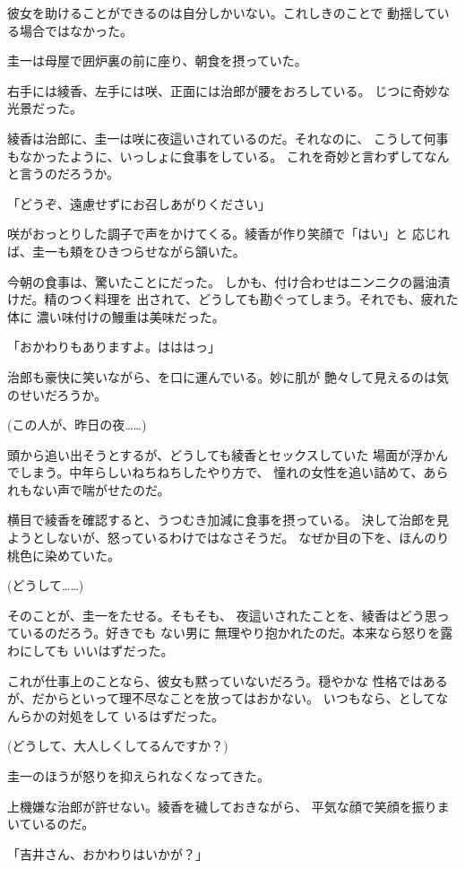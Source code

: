 ﻿\documentclass[
    book,tate,
    line_length=30zw,
    jafontsize=12pt,
    paper=b5j,
    landscape,
    ]{jlreq}
\begin{document}
彼女を助けることができるのは自分しかいない。これしきのことで
動揺している場合ではなかった。

圭一は母屋で囲炉裏の前に座り、朝食を摂っていた。

右手には綾香、左手には咲、正面には治郎が腰をおろしている。
じつに奇妙な光景だった。

綾香は治郎に、圭一は咲に夜這いされているのだ。それなのに、
こうして何事もなかったように、いっしょに食事をしている。
これを奇妙と言わずしてなんと言うのだろうか。

「どうぞ、遠慮せずにお召しあがりください」

咲がおっとりした調子で声をかけてくる。綾香が作り笑顔で「はい」と
応じれば、圭一も頬をひきつらせながら頷いた。

今朝の食事は、驚いたことにだった。
しかも、付け合わせはニンニクの醤油漬けだ。精のつく料理を
出されて、どうしても勘ぐってしまう。それでも、疲れた体に
濃い味付けの鰻重は美味だった。

「おかわりもありますよ。はははっ」

治郎も豪快に笑いながら、を口に運んでいる。妙に肌が
艶々して見えるのは気のせいだろうか。

(この人が、昨日の夜……)

頭から追い出そうとするが、どうしても綾香とセックスしていた
場面が浮かんでしまう。中年らしいねちねちしたやり方で、
憧れの女性を追い詰めて、あられもない声で喘がせたのだ。

横目で綾香を確認すると、うつむき加減に食事を摂っている。
決して治郎を見ようとしないが、怒っているわけではなさそうだ。
なぜか目の下を、ほんのり桃色に染めていた。

(どうして……)

そのことが、圭一をたせる。そもそも、
夜這いされたことを、綾香はどう思っているのだろう。好きでも
ない男に 無理やり抱かれたのだ。本来なら怒りを露わにしても
いいはずだった。

これが仕事上のことなら、彼女も黙っていないだろう。穏やかな
性格ではあるが、だからといって理不尽なことを放ってはおかない。
いつもなら、としてなんらかの対処をして
いるはずだった。

(どうして、大人しくしてるんですか？)

圭一のほうが怒りを抑えられなくなってきた。

上機嫌な治郎が許せない。綾香を穢しておきながら、
平気な顔で笑顔を振りまいているのだ。

「吉井さん、おかわりはいかが？」
\end{document}
